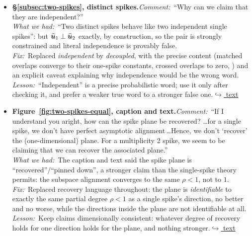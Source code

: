 \documentclass[12pt]{article}
\newcommand{\gdlogentry}[6]{%
  \item[\textcolor{thesisRev}{$\star$\,\ref{gdrev:#1}}]\hypertarget{gdlog:#1}{}%
  \textbf{#2.}\enspace\emph{Comment:}~#3\\
  \emph{What we had:}~#4\\
  \emph{Fix:}~#5\\
  \emph{Lesson:}~#6\enspace\hyperlink{gdtext:#1}{\textcolor{thesisLink}{$\hookrightarrow$ text}}}
\begin{document}
\begin{itemize}[leftmargin=2.4em,itemsep=0.55em]
\gdlogentry{r3-decoupled}{\S\ref{subsec:two-spikes}, distinct spikes}{``Why can we claim that they are independent?''}{``Two distinct spikes behave like two independent single spikes'': but \(\widehat{\bm{u}}_1 \perp \widehat{\bm{u}}_2\) exactly, by construction, so the pair is strongly constrained and literal independence is provably false.}{Replaced \emph{independent} by \emph{decoupled}, with the precise content (matched overlaps converge to their one-spike constants, crossed overlaps to zero, \citealp{BenaychGeorgesNadakuditi2011, Paul2007}) and an explicit caveat explaining why independence would be the wrong word.}{``Independent'' is a precise probabilistic word; use it only after checking it, and prefer a weaker true word to a stronger false one.}

\gdlogentry{r3-plane}{Figure~\ref{fig:two-spikes-equal}, caption and text}{``If I understand you aright, how can the spike plane be recovered? \dots for a single spike, we don't have perfect asymptotic alignment\,\dots Hence, we don't `recover' the (one-dimensional) plane. For a multiplicity 2 spike, we seem to be claiming that we can recover the associated plane.''}{The caption and text said the spike plane is ``recovered''/``pinned down'', a stronger claim than the single-spike theory permits: the subspace alignment converges to the same \(\rho < 1\), not to \(1\).}{Replaced recovery language throughout: the plane is \emph{identifiable} to exactly the same partial degree \(\rho < 1\) as a single spike's direction, no better and no worse, while the directions inside the plane are not identifiable at all.}{Keep claims dimensionally consistent: whatever degree of recovery holds for one direction holds for the plane, and nothing stronger.}
\end{itemize}
\end{document}
